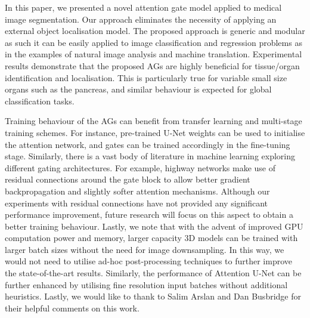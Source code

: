 \documentclass{article}
\begin{document}
In this paper, we presented a novel attention gate model applied to medical image segmentation. Our approach eliminates the necessity of applying an external object localisation model. The proposed approach is generic and modular as such it can be easily applied to image classification and regression problems as in the examples of natural image analysis and machine translation. Experimental results demonstrate that the proposed AGs are highly beneficial for tissue/organ identification and localisation. This is particularly true for variable small size organs such as the pancreas, and similar behaviour is expected for global classification tasks. 

Training behaviour of the AGs can benefit from transfer learning and multi-stage training schemes. For instance, pre-trained U-Net weights can be used to initialise the attention network, and gates can be trained accordingly in the fine-tuning stage. Similarly, there is a vast body of literature in machine learning exploring different gating architectures. For example, highway networks \cite{greff2016highway} make use of residual connections around the gate block to allow better gradient backpropagation and slightly softer attention mechanisms. Although our experiments with residual connections have not provided any significant performance improvement, future research will focus on this aspect to obtain a better training behaviour. Lastly, we note that with the advent of improved GPU computation power and memory, larger capacity 3D models can be trained with larger batch sizes without the need for image downsampling. In this way, we would not need to utilise ad-hoc post-processing techniques to further improve the state-of-the-art results. Similarly, the performance of Attention U-Net can be further enhanced by utilising fine resolution input batches without additional heuristics. Lastly, we would like to thank to Salim Arslan and Dan Busbridge for their helpful comments on this work. 



\end{document}
